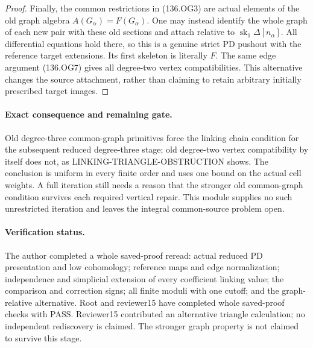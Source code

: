 \begin{proof}
Finally, the common restrictions in (136.OG3) are actual
elements of the old graph algebra \(A(G_\alpha)=F(G_\alpha)\).
One may instead identify the whole graph of each new pair
with these old sections and attach relative to
\(\operatorname{sk}_1\Delta[n_\alpha]\).
All differential equations hold there, so this is a genuine
strict PD pushout with the reference target extensions.
Its first skeleton is literally \(F\).  The same edge
argument (136.OG7) gives all degree-two vertex compatibilities.
This alternative changes the source attachment, rather than
claiming to retain arbitrary initially prescribed target images.
\end{proof}

\paragraph{Exact consequence and remaining gate.}
Old degree-three common-graph primitives force the linking
chain condition for the subsequent reduced degree-three stage;
old degree-two vertex compatibility by itself does not, as
LINKING-TRIANGLE-OBSTRUCTION shows.  The conclusion is uniform
in every finite order and uses one bound on the actual cell
weights.  A full iteration still needs a reason that the
stronger old common-graph condition survives each required
vertical repair.  This module supplies no such unrestricted
iteration and leaves the integral common-source problem open.

\paragraph{Verification status.}
The author completed a whole saved-proof reread: actual reduced
PD presentation and low cohomology; reference maps and edge
normalization; independence and simplicial extension of every
coefficient linking value; the comparison and correction signs;
all finite moduli with one cutoff; and the graph-relative
alternative.  Root and reviewer15 have completed whole saved-proof checks
with PASS.  Reviewer15 contributed an alternative triangle
calculation; no independent rediscovery is claimed.  The
stronger graph property is not claimed to survive this stage.
